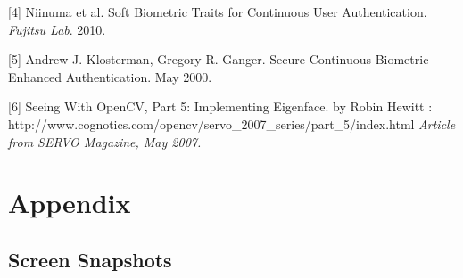 \documentclass[12pt]{article}			%
\begin{document}
[4] Niinuma et al. Soft Biometric Traits for Continuous User Authentication. \textit{Fujitsu Lab}. 2010.

[5] Andrew J. Klosterman, Gregory R. Ganger. Secure Continuous Biometric-Enhanced Authentication. May 2000.

[6] Seeing With OpenCV, Part 5: Implementing Eigenface. by Robin Hewitt : http://www.cognotics.com/opencv/servo_2007_series/part_5/index.html \textit { Article from SERVO Magazine, May 2007. } 

\section{ Appendix }
\subsection{ Screen Snapshots}

\end{document}
